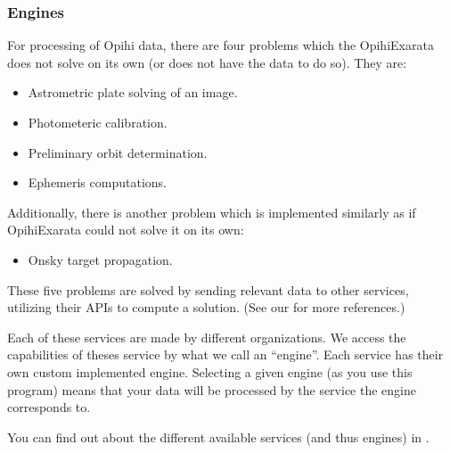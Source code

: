 \documentclass[letterpaper,11pt,english]{sphinxmanual}
\begin{document}
\subsubsection{Engines}
\label{\detokenize{user/system_framework:engines}}
\sphinxAtStartPar
For processing of Opihi data, there are four problems which the OpihiExarata
does not solve on its own (or does not have the data to do so). They are:
\begin{itemize}
\item {} 
\sphinxAtStartPar
Astrometric plate solving of an image.

\item {} 
\sphinxAtStartPar
Photometeric calibration.

\item {} 
\sphinxAtStartPar
Preliminary orbit determination.

\item {} 
\sphinxAtStartPar
Ephemeris computations.

\end{itemize}

\sphinxAtStartPar
Additionally, there is another problem which is implemented similarly as if
OpihiExarata could not solve it on its own:
\begin{itemize}
\item {} 
\sphinxAtStartPar
On\sphinxhyphen{}sky target propagation.

\end{itemize}

\sphinxAtStartPar
These five problems are solved by sending relevant data to other services,
utilizing their APIs to compute a solution. (See our {\hyperref[\detokenize{user/citations:user-citations}]{}} for
more references.)

\sphinxAtStartPar
Each of these services are made by different organizations. We access the
capabilities of theses service by what we call an “engine”. Each service has
their own custom implemented engine. Selecting a given engine (as you use this
program) means that your data will be processed by the service the engine
corresponds to.

\sphinxAtStartPar
You can find out about the different available services (and thus engines) in
{\hyperref[\detokenize{technical/architecture/services_engines:technical-architecture-services-engines}]{}}.
\end{document}
